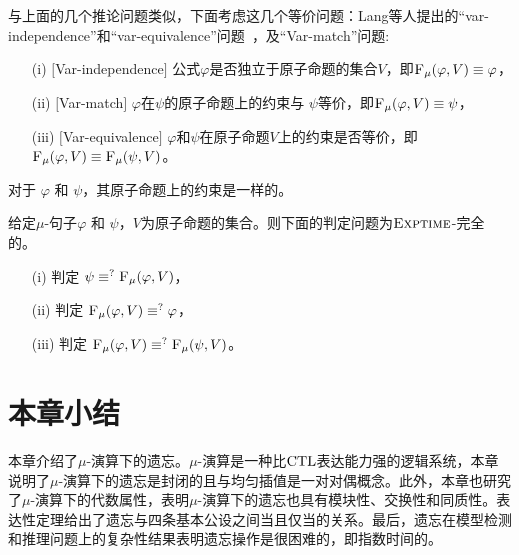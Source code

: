 与上面的几个推论问题类似，下面考虑这几个等价问题：Lang等人提出的“var-independence”和“var-equivalence”问题~\cite{lang2003propositional}，及“Var-match”问题:
\begin{itemize}
	\item[(i)] $[$Var-independence$]$ 公式$\varphi$是否独立于原子命题的集合$V$，即${\textsc{F}_{\textsc{$\mu$}}}(\varphi,V) \equiv \varphi$，
	\item[(ii)] $[$Var-match$]$  $\varphi$在$\psi$的原子命题上的约束与 $\psi$等价，即${\textsc{F}_{\textsc{$\mu$}}}(\varphi, V) \equiv \psi$，
	\item[(iii)] $[$Var-equivalence$]$  $\varphi$和$\psi$在原子命题$V$上的约束是否等价，即${\textsc{F}_{\textsc{$\mu$}}}(\varphi, V) \equiv {\textsc{F}_{\textsc{$\mu$}}}(\psi, V)$。
\end{itemize}
对于 $\varphi$ 和 $\psi$，其原子命题上的约束是一样的。

\begin{corollary}\label{chapter06:cor:equiv}
	给定$\mu$-句子$\varphi$ 和 $\psi$，$V$为原子命题的集合。则下面的判定问题为$\textsc{Exptime}$-完全的。
	\begin{itemize}
		\item[(i)] 判定 $\psi \equiv^?{\textsc{F}_{\textsc{$\mu$}}}(\varphi, V)$，
		\item[(ii)] 判定 ${\textsc{F}_{\textsc{$\mu$}}}(\varphi, V) \equiv^? \varphi$，
		\item[(iii)] 判定 ${\textsc{F}_{\textsc{$\mu$}}}(\varphi, V) \equiv^? {\textsc{F}_{\textsc{$\mu$}}}(\psi, V)$。
	\end{itemize}
\end{corollary}
\section{本章小结}\label{sec:chapter06-conclusion}

本章介绍了$\mu$-演算下的遗忘。$\mu$-演算是一种比$\textrm{CTL}$表达能力强的逻辑系统，本章说明了$\mu$-演算下的遗忘是封闭的且与均匀插值是一对对偶概念。此外，本章也研究了$\mu$-演算下的代数属性，表明$\mu$-演算下的遗忘也具有模块性、交换性和同质性。表达性定理给出了遗忘与四条基本公设之间当且仅当的关系。最后，遗忘在模型检测和推理问题上的复杂性结果表明遗忘操作是很困难的，即指数时间的。
